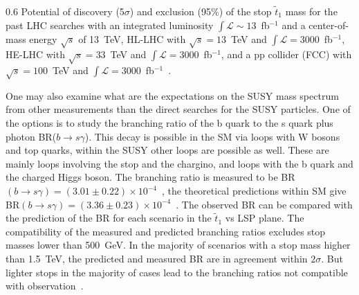                  {0.6}       %
                 { Potential of discovery (5$\sigma$) and exclusion (95\%) of the stop $\tilde{t}_{1}$ mass for the past LHC searches with an integrated luminosity $\int \mathcal{L} \sim 13$~fb$^{-1}$ and a center-of-mass energy $\sqrt{s}$ of 13~TeV, HL-LHC with $\sqrt{s}= 13$~TeV and $\int \mathcal{L} = 3000$~fb$^{-1}$, HE-LHC with $\sqrt{s}= 33$~TeV and $\int \mathcal{L} = 3000$~fb$^{-1}$,  and a pp collider (FCC) with $\sqrt{s}= 100$~TeV and $\int \mathcal{L} = 3000$~fb$^{-1}$~\cite{Baer:2016bwh}.  }


One may also examine what are the expectations on the SUSY mass spectrum from other measurements than the direct searches for the SUSY particles. One of the options is to study the branching ratio of the b quark to the s quark plus photon BR($b \to s\gamma$).  This decay is possible in the SM via loops with W bosons and top quarks, within the SUSY other loops are possible as well. These are mainly loops involving the  stop and the chargino, and loops with the b quark and the charged Higgs boson. The branching ratio is measured to be BR$(b \to s\gamma) = (3.01 \pm 0.22) \times 10^{-4}$~\cite{Belle:2016ufb}, the theoretical predictions within SM give BR$(b \to s\gamma) = (3.36 \pm 0.23) \times 10^{-4}$~\cite{Misiak:2015xwa}. The observed BR can be compared with the prediction of the BR for each scenario in the $\tilde{t}_{1}$ vs LSP plane. The compatibility of the measured and predicted branching ratios excludes stop masses lower than 500~GeV. In the majority of scenarios with a stop mass higher than 1.5~TeV, the predicted and measured BR are in agreement within $2\sigma$. But lighter stops in the majority of cases lead to the branching ratios not compatible with observation~\cite{Baer:2016bwh}.

